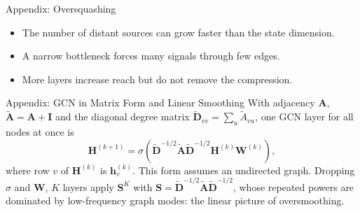 \documentclass{ntuabeamer}
\begin{document}
\begin{frame}{Appendix: Oversquashing}
  \begin{center}
  \end{center}
  \begin{itemize}
    \item The number of distant sources can grow faster than the state dimension.
    \item A narrow bottleneck forces many signals through few edges.
    \item More layers increase reach but do not remove the compression.
  \end{itemize}
\end{frame}

\begin{frame}{Appendix: GCN in Matrix Form and Linear Smoothing}
  With adjacency $\mathbf A$, $\widetilde{\mathbf A}=\mathbf A+\mathbf I$ and the diagonal degree matrix
  $\widetilde{\mathbf D}_{vv}=\sum_u\widetilde A_{vu}$, one GCN layer for all nodes at once is
  \[
    \mathbf H^{(k+1)}=\sigma\!\left(
      \widetilde{\mathbf D}^{-1/2}\widetilde{\mathbf A}\widetilde{\mathbf D}^{-1/2}
      \mathbf H^{(k)}\mathbf W^{(k)}\right),
  \]
  where row $v$ of $\mathbf H^{(k)}$ is $\mathbf h_v^{(k)}$. This form assumes an undirected graph.
  Dropping $\sigma$ and $\mathbf W$, $K$ layers apply $\mathbf S^K$ with
  $\mathbf S=\widetilde{\mathbf D}^{-1/2}\widetilde{\mathbf A}\widetilde{\mathbf D}^{-1/2}$,
  whose repeated powers are dominated by low-frequency graph modes: the linear picture of oversmoothing.
\end{frame}
\end{document}
